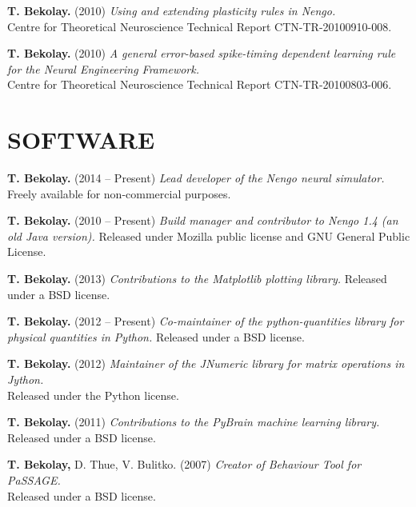 \documentclass[line,margin]{res}
\begin{document}
\begin{resume}
\textbf{T. Bekolay.} (2010)
  {\sl Using and extending plasticity rules in Nengo.} \\
  Centre for Theoretical Neuroscience Technical Report CTN-TR-20100910-008.

\textbf{T. Bekolay.} (2010)
  {\sl A general error-based spike-timing dependent learning rule for
  the Neural Engineering Framework.} \\
  Centre for Theoretical Neuroscience Technical Report CTN-TR-20100803-006.



\section{SOFTWARE}

\textbf{T. Bekolay.} (2014 -- Present)
  {\sl Lead developer of the Nengo neural simulator.}
  Freely available for non-commercial purposes.

\textbf{T. Bekolay.} (2010 -- Present)
  {\sl Build manager and contributor to Nengo 1.4 (an old Java version).}
  Released under Mozilla public license and GNU General Public License.

\textbf{T. Bekolay.} (2013)
  {\sl Contributions to the Matplotlib plotting library.}
  Released under a BSD license.

\textbf{T. Bekolay.} (2012 -- Present)
  {\sl Co-maintainer of the python-quantities library for physical quantities
  in Python.} Released under a BSD license.

\textbf{T. Bekolay.} (2012)
  {\sl Maintainer of the JNumeric library for matrix operations in Jython.} \\
  Released under the Python license.

\textbf{T. Bekolay.} (2011)
  {\sl Contributions to the PyBrain machine learning library.} \\
  Released under a BSD license.

\textbf{T. Bekolay,} D. Thue, V. Bulitko. (2007)
  {\sl Creator of Behaviour Tool for PaSSAGE.} \\
  Released under a BSD license.

\label{LastPage}
\end{resume}
\end{document}
